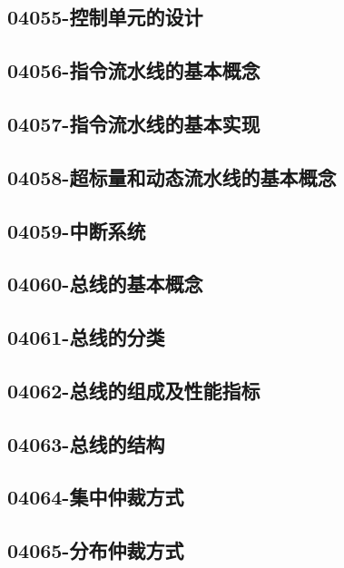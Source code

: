 \subsection{04055-控制单元的设计}

\subsection{04056-指令流水线的基本概念}

\subsection{04057-指令流水线的基本实现}

\subsection{04058-超标量和动态流水线的基本概念}

\subsection{04059-中断系统}

\subsection{04060-总线的基本概念}

\subsection{04061-总线的分类}

\subsection{04062-总线的组成及性能指标}

\subsection{04063-总线的结构}

\subsection{04064-集中仲裁方式}

\subsection{04065-分布仲裁方式}

